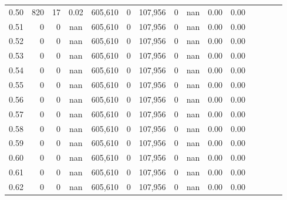 \begin{tabular}{rrrcrrrrrrrrrrr}
0.50 &     820 &     17 &                                       0.02 &  605,610 &        0 &  107,956 &        0 &   nan &  0.00 &                         0.00 \\
0.51 &       0 &      0 &                                        nan &  605,610 &        0 &  107,956 &        0 &   nan &  0.00 &                         0.00 \\
0.52 &       0 &      0 &                                        nan &  605,610 &        0 &  107,956 &        0 &   nan &  0.00 &                         0.00 \\
0.53 &       0 &      0 &                                        nan &  605,610 &        0 &  107,956 &        0 &   nan &  0.00 &                         0.00 \\
0.54 &       0 &      0 &                                        nan &  605,610 &        0 &  107,956 &        0 &   nan &  0.00 &                         0.00 \\
0.55 &       0 &      0 &                                        nan &  605,610 &        0 &  107,956 &        0 &   nan &  0.00 &                         0.00 \\
0.56 &       0 &      0 &                                        nan &  605,610 &        0 &  107,956 &        0 &   nan &  0.00 &                         0.00 \\
0.57 &       0 &      0 &                                        nan &  605,610 &        0 &  107,956 &        0 &   nan &  0.00 &                         0.00 \\
0.58 &       0 &      0 &                                        nan &  605,610 &        0 &  107,956 &        0 &   nan &  0.00 &                         0.00 \\
0.59 &       0 &      0 &                                        nan &  605,610 &        0 &  107,956 &        0 &   nan &  0.00 &                         0.00 \\
0.60 &       0 &      0 &                                        nan &  605,610 &        0 &  107,956 &        0 &   nan &  0.00 &                         0.00 \\
0.61 &       0 &      0 &                                        nan &  605,610 &        0 &  107,956 &        0 &   nan &  0.00 &                         0.00 \\
0.62 &       0 &      0 &                                        nan &  605,610 &        0 &  107,956 &        0 &   nan &  0.00 &                         0.00 \\

\end{tabular}
